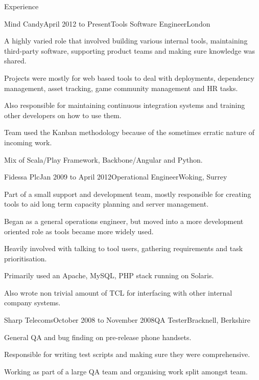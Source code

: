 \documentclass{resume} %
\begin{document}

\begin{rSection}{Experience}

  \begin{rExperience}{Mind Candy}{April 2012 to Present}{Tools Software Engineer}{London}
  \item A highly varied role that involved building various internal tools, maintaining third-party software, supporting product teams and making sure knowledge was shared.
  \item Projects were mostly for web based tools to deal with deployments, dependency management, asset tracking, game community management and HR tasks.
  \item Also responsible for maintaining continuous integration systems and training other developers on how to use them.
  \item Team used the Kanban methodology because of the sometimes erratic nature of incoming work.
  \item Mix of Scala/Play Framework, Backbone/Angular and Python.
  \end{rExperience}


  \begin{rExperience}{Fidessa Plc}{Jan 2009 to April 2012}{Operational Engineer}{Woking, Surrey}
  \item Part of a small support and development team, mostly responsible for creating tools to aid long term capacity planning and server management.
  \item Began as a general operations engineer, but moved into a more development oriented role as tools became more widely used.
  \item Heavily involved with talking to tool users, gathering requirements and task prioritisation.
  \item Primarily used an Apache, MySQL, PHP stack running on Solaris.
  \item Also wrote non trivial amount of TCL for interfacing with other internal company systems.
  \end{rExperience}


  \begin{rExperience}{Sharp Telecoms}{October 2008 to November 2008}{QA Tester}{Bracknell, Berkshire}
  \item General QA and bug finding on pre-release phone handsets.
  \item Responsible for writing test scripts and making sure they were comprehensive.
  \item Working as part of a large QA team and organising work split amongst team.
  \end{rExperience}


\end{rSection}
\end{document}
